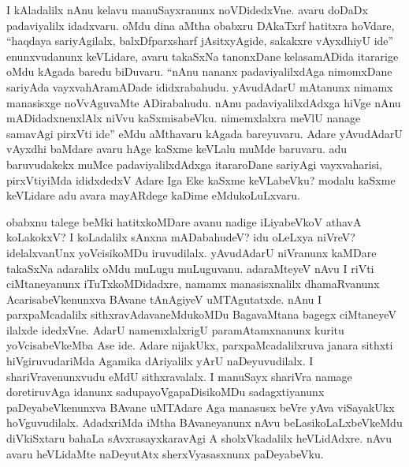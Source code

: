 I kAladalilx nAnu kelavu manuSayxranunx noVDidedxVne. avaru doDaDx padaviyalilx idadxvaru. oMdu dina aMtha obabxru DAkaTxrf hatitxra hoVdare, ``haqdaya sariyAgilalx, balxDfparxsharf jAsitxyAgide, sakakxre vAyxdhiyU ide'' enunxvudanunx keVLidare, avaru takaSxNa tanonxDane kelasamADida itararige oMdu kAgada baredu biDuvaru. ``nAnu nananx padaviyalilxdAga nimomxDane sariyAda vayxvahAramADade ididxrabahudu. yAvudAdarU mAtanunx nimamx manasisxge noVvAguvaMte ADirabahudu. nAnu padaviyalilxdAdxga hiVge nAnu mADidadxnenxlAlx niVvu kaSxmisabeVku. nimemxlalxra meVlU nanage samavAgi pirxVti ide'' eMdu aMthavaru kAgada bareyuvaru. Adare yAvudAdarU vAyxdhi baMdare avaru hAge kaSxme keVLalu muMde baruvaru. adu baruvudakekx muMce padaviyalilxdAdxga itararoDane sariyAgi vayxvaharisi, pirxVtiyiMda ididxdedxV Adare Iga Eke kaSxme keVLabeVku? modalu kaSxme keVLidare adu avara mayARdege kaDime eMdukoLuLxvaru.

obabxnu talege beMki hatitxkoMDare avanu nadige iLiyabeVkoV athavA koLakokxV? I koLadalilx sAnxna mADabahudeV? idu oLeLxya niVreV? idelalxvanUnx yoVcisikoMDu iruvudilalx. yAvudAdarU niVranunx kaMDare takaSxNa adaralilx oMdu muLugu muLuguvanu. adaraMteyeV nAvu I riVti ciMtaneyanunx iTuTxkoMDidadxre, namamx manasisxnalilx dhamaRvanunx AcarisabeVkenunxva BAvane tAnAgiyeV uMTAgutatxde. nAnu I parxpaMcadalilx sithxravAdavaneMdukoMDu BagavaMtana bagegx ciMtaneyeV ilalxde idedxVne. AdarU namemxlalxrigU paramAtamxnanunx kuritu yoVcisabeVkeMba Ase ide. Adare nijakUkx, parxpaMcadalilxruva janara sithxti hiVgiruvudariMda Agamika dAriyalilx yArU naDeyuvudilalx. I shariVravenunxvudu eMdU sithxravalalx. I manuSayx shariVra namage doretiruvAga idanunx sadupayoVgapaDisikoMDu sadagxtiyanunx paDeyabeVkenunxva BAvane uMTAdare Aga manasusx beVre yAva viSayakUkx hoVguvudilalx. AdadxriMda iMtha BAvaneyanunx nAvu beLasikoLaLxbeVkeMdu diVkiSxtaru bahaLa sAvxrasayxkaravAgi A sholxVkadalilx heVLidAdxre. nAvu avaru heVLidaMte naDeyutAtx sherxVyasasxnunx paDeyabeVku.



\endchapter
